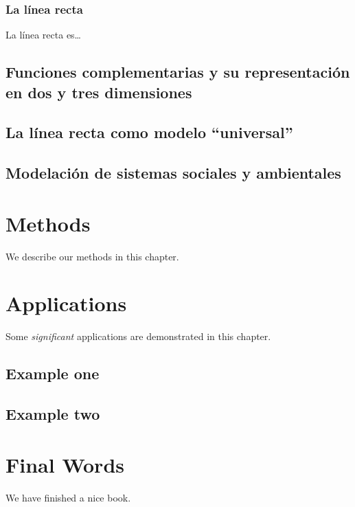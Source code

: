 \documentclass[
]{book}
\begin{document}
\hypertarget{la-luxednea-recta}{%
\subsection{La línea recta}\label{la-luxednea-recta}}

La línea recta es\ldots{}

\hypertarget{funciones-complementarias-y-su-representaciuxf3n-en-dos-y-tres-dimensiones}{%
\section{Funciones complementarias y su representación en dos y tres dimensiones}\label{funciones-complementarias-y-su-representaciuxf3n-en-dos-y-tres-dimensiones}}

\hypertarget{la-luxednea-recta-como-modelo-universal}{%
\section{La línea recta como modelo ``universal''}\label{la-luxednea-recta-como-modelo-universal}}

\hypertarget{modelaciuxf3n-de-sistemas-sociales-y-ambientales}{%
\section{Modelación de sistemas sociales y ambientales}\label{modelaciuxf3n-de-sistemas-sociales-y-ambientales}}

\hypertarget{methods}{%
\chapter{Methods}\label{methods}}

We describe our methods in this chapter.

\hypertarget{applications}{%
\chapter{Applications}\label{applications}}

Some \emph{significant} applications are demonstrated in this chapter.

\hypertarget{example-one}{%
\section{Example one}\label{example-one}}

\hypertarget{example-two}{%
\section{Example two}\label{example-two}}

\hypertarget{final-words}{%
\chapter{Final Words}\label{final-words}}

We have finished a nice book.

  
\end{document}
